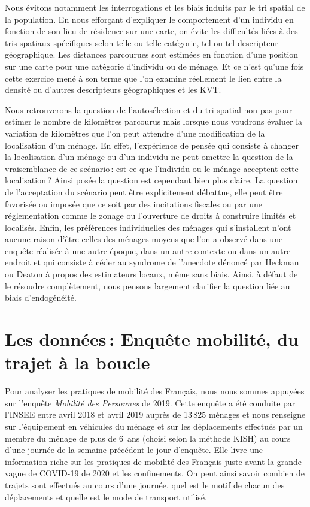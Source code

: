 \documentclass[
  9pt,
  a4paper,
  DIV=11]{scrreprt}
\begin{document}
Nous évitons notamment les interrogations et les biais induits par le
tri spatial de la population. En nous efforçant d'expliquer le
comportement d'un individu en fonction de son lieu de résidence sur une
carte, on évite les difficultés liées à des tris spatiaux spécifiques
selon telle ou telle catégorie, tel ou tel descripteur géographique. Les
distances parcourues sont estimées en fonction d'une position sur une
carte pour une catégorie d'individu ou de ménage. Et ce n'est qu'une
fois cette exercice mené à son terme que l'on examine réellement le lien
entre la densité ou d'autres descripteurs géographiques et les KVT.

Nous retrouverons la question de l'autosélection et du tri spatial non
pas pour estimer le nombre de kilomètres parcourus mais lorsque nous
voudrons évaluer la variation de kilomètres que l'on peut attendre d'une
modification de la localisation d'un ménage. En effet, l'expérience de
pensée qui consiste à changer la localisation d'un ménage ou d'un
individu ne peut omettre la question de la vraisemblance de ce
scénario\,: est ce que l'individu ou le ménage acceptent cette
localisation\,? Ainsi posée la question est cependant bien plus claire.
La question de l'acceptation du scénario peut être explicitement
débattue, elle peut être favorisée ou imposée que ce soit par des
incitations fiscales ou par une réglementation comme le zonage ou
l'ouverture de droits à construire limités et localisés. Enfin, les
préférences individuelles des ménages qui s'installent n'ont aucune
raison d'être celles des ménages moyens que l'on a observé dans une
enquête réalisée à une autre époque, dans un autre contexte ou dans un
autre endroit et qui consiste à céder au syndrome de l'anecdote dénoncé
par Heckman ou Deaton à propos des estimateurs locaux, même sans biais.
Ainsi, à défaut de le résoudre complètement, nous pensons largement
clarifier la question liée au biais d'endogénéité.

\chapter{Les données\,: Enquête mobilité, du trajet à la
boucle}\label{les-donnuxe9es-enquuxeate-mobilituxe9-du-trajet-uxe0-la-boucle}

Pour analyser les pratiques de mobilité des Français, nous nous sommes
appuyées sur l'enquête \emph{Mobilité des Personnes} de 2019. Cette
enquête a été conduite par l'INSEE entre avril 2018 et avril 2019 auprès
de 13\,825 ménages et nous renseigne sur l'équipement en véhicules du
ménage et sur les déplacements effectués par un membre du ménage de plus
de 6~ans (choisi selon la méthode KISH) au cours d'une journée de la
semaine précédent le jour d'enquête. Elle livre une information riche
sur les pratiques de mobilité des Français juste avant la grande vague
de COVID-19 de 2020 et les confinements. On peut ainsi savoir combien de
trajets sont effectués au cours d'une journée, quel est le motif de
chacun des déplacements et quelle est le mode de transport utilisé.
\end{document}
